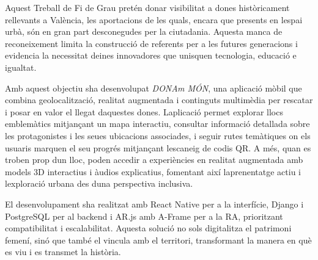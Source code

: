 \documentclass[twoside,spanish,a4paper,12pt]{tfg}
\begin{document}
\begin{resum}
\setlength{\parskip}{8pt plus 2pt minus 1pt}

Aquest Treball de Fi de Grau pretén donar visibilitat a dones històricament rellevants a València, les aportacions de les quals, encara que presents en l\textquotesingle espai urbà, són en gran part desconegudes per la ciutadania. Aquesta manca de reconeixement limita la construcció de referents per a les futures generacions i evidencia la necessitat d\textquotesingle eines innovadores que unisquen tecnologia, educació e igualtat.

Amb aquest objectiu s\textquotesingle ha desenvolupat \textit{DONA\textquotesingle m MÓN}, una aplicació mòbil que combina geolocalització, realitat augmentada i continguts multimèdia per rescatar i posar en valor el llegat d\textquotesingle aquestes dones. L\textquotesingle aplicació permet explorar llocs emblemàtics mitjançant un mapa interactiu, consultar informació detallada sobre les protagonistes i les seues ubicacions associades, i seguir rutes temàtiques on els usuaris marquen el seu progrés mitjançant l\textquotesingle escaneig de codis QR. A més, quan es troben prop d\textquotesingle un lloc, poden accedir a experiències en realitat augmentada amb models 3D interactius i àudios explicatius, fomentant així l\textquotesingle aprenentatge actiu i l\textquotesingle exploració urbana des d\textquotesingle una perspectiva inclusiva.

El desenvolupament s\textquotesingle ha realitzat amb React Native per a la interfície, Django i PostgreSQL per al backend i AR.js amb A-Frame per a la RA, prioritzant compatibilitat i escalabilitat. Aquesta solució no sols digitalitza el patrimoni femení, sinó que també el vincula amb el territori, transformant la manera en què es viu i es transmet la història.

\end{resum}
\cleardoublepage
\end{document}
